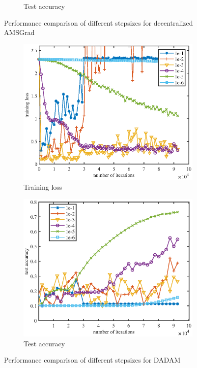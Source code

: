 \documentclass{article} %
\begin{document}
\begin{figure}[H]
\begin{subfigure}{.45\textwidth}
	\caption{\small  Test accuracy}
	\end{subfigure}
	\caption{Performance comparison of different stepsizes for decentralized AMSGrad} \vspace{0.2in}
	\label{fig: amsgrad_curve}
	\begin{subfigure}{.45\textwidth}
	\centering
	\includegraphics[width=\textwidth]{figures/adam_train.eps}
	\caption{\small Training loss}
	\end{subfigure}
\begin{subfigure}{.45\textwidth}
	\centering
		\includegraphics[width=\textwidth]{figures/adam_test.eps}
	\caption{\small  Test accuracy}
	\end{subfigure}
	\caption{Performance comparison of different stepsizes for DADAM}
	\label{fig: adam_curve}
\end{figure}
\end{document}
